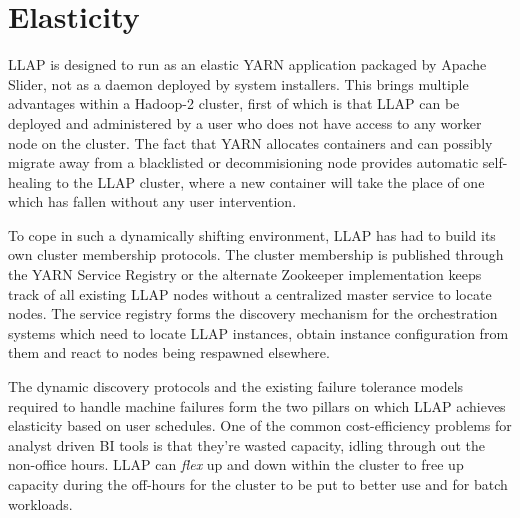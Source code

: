 \section{Elasticity}

LLAP is designed to run as an elastic YARN application packaged by Apache Slider\cite{slider}, not as a daemon deployed by system installers. This brings multiple advantages within
a Hadoop-2 cluster, first of which is that LLAP can be deployed and administered by a user who does not have access to any worker node on the cluster. The fact that YARN allocates
containers and can possibly migrate away from a blacklisted or decommisioning node provides automatic self-healing to the LLAP cluster, where a new container will take the place 
of one which has fallen without any user intervention.

To cope in such a dynamically shifting environment, LLAP has had to build its own cluster membership protocols. The cluster membership is published through the YARN Service Registry or the 
alternate Zookeeper implementation keeps track of all existing LLAP nodes without a centralized master service to locate nodes. The service registry forms the discovery mechanism for the
orchestration systems which need to locate LLAP instances, obtain instance configuration from them and react to nodes being respawned elsewhere.

The dynamic discovery protocols and the existing failure tolerance models required to handle machine failures form the two pillars on which LLAP achieves elasticity based on user schedules. 
One of the common cost-efficiency problems for analyst driven BI tools is that they're wasted capacity, idling through out the non-office hours.  LLAP can \emph{flex} up and down within the
cluster to free up capacity during the off-hours for the cluster to be put to better use and for batch workloads.

